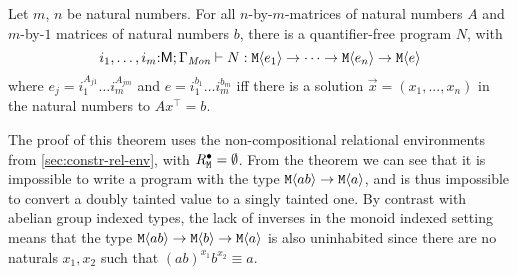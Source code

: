 







\begin{theorem}
  \label{thm:monoid-indefinability}
  Let $m$, $n$ be natural numbers. For all $n$-by-$m$-matrices of
  natural numbers $A$ and $m$-by-$1$ matrices of natural numbers $b$,
  there is a quantifier-free program $N$, with
  \begin{displaymath}
    i_1,\dots,i_m\mathord:\mathsf{M}; \Gamma_{\textit{Mon}} \vdash N : \textup{\texttt{M}}\langle e_1 \rangle \to \dots \to \textup{\texttt{M}}\langle e_n \rangle \to \textup{\texttt{M}}\langle e \rangle
  \end{displaymath}
  where $e_j = i_1^{A_{j1}}\dots i_m^{A_{jm}}$ and $e = i_1^{b_1}\dots
  i_m^{b_m}$ iff there is a solution $\vec{x} = (x_1,...,x_n)$ in the
  natural numbers to $A x^\top = b$.
\end{theorem}

The proof of this theorem uses the non-compositional relational
environments from \autoref{sec:constr-rel-env}, with
$R^\bullet_{\textup{\texttt{M}}} = \emptyset$. From the theorem we can see
that it is impossible to write a program with the type
$\textup{\texttt{M}}\langle ab \rangle \to \textup{\texttt{M}}\langle a \rangle$, and is thus impossible to
convert a doubly tainted value to a singly tainted one.
%
By contrast with abelian group indexed types, the lack of inverses in
the monoid indexed setting means that the type $\textup{\texttt{M}}\langle ab \rangle \to
\textup{\texttt{M}}\langle b \rangle \to \textup{\texttt{M}}\langle a \rangle$ is also uninhabited since there are
no naturals $x_1,x_2$ such that $(ab)^{x_1}b^{x_2} \equiv a$.



